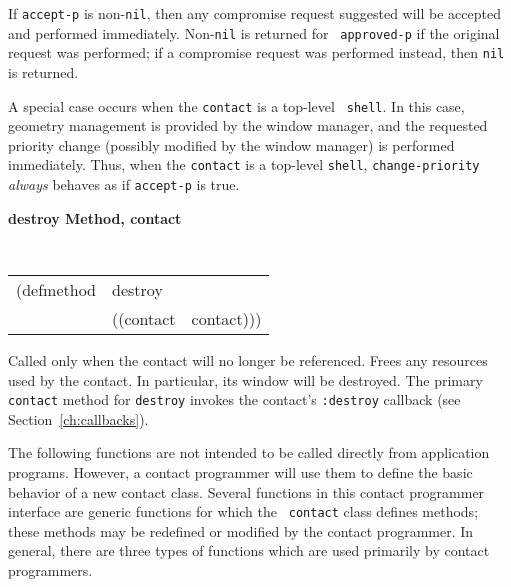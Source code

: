 \documentclass[twoside]{book}
\begin{document}
\begin{sloppy}
\begin{flushright}\parbox[t]{6.125in}{
If {\tt accept-p} is non-{\tt nil}, then any compromise request suggested will be
accepted and performed immediately. Non-{\tt nil} is returned for {\tt
approved-p} if the original request was performed; if a compromise request was
performed instead, then {\tt nil} is returned.
}\end{flushright}

\begin{flushright}\parbox[t]{6.125in}{ 
A special case occurs when the {\tt contact} is a top-level {\tt
shell}. In this case, geometry management
is provided by the window manager, and the requested
priority
change (possibly modified by the window manager) is performed immediately.
Thus, when the {\tt contact} is a top-level {\tt shell}, {\tt change-priority}
{\em always} behaves as if {\tt accept-p} is true.
}\end{flushright}


{\samepage
{\large {\bf destroy \hfill Method, contact}}
\begin{flushright}
\parbox[t]{6.125in}{
\tt
\begin{tabular}{lll}
\raggedright
(defmethod & destroy & \\
& ((contact  &contact)))
\end{tabular}
\rm
}\end{flushright}

\begin{flushright}\parbox[t]{6.125in}{
Called only when the contact will no longer be referenced. Frees any
resources used by the contact. In particular, its window will be destroyed.
The primary {\tt contact} method for {\tt destroy} invokes the contact's
{\tt :destroy} callback (see Section~\ref{ch:callbacks}).
}\end{flushright} }


The following functions are
not intended to be called directly
from application programs. However, a contact programmer will  use them to
define the basic behavior of a new contact
class. 
Several functions in this contact programmer interface are generic functions for
which the {\tt
contact} class defines methods; these methods may be redefined or modified by the
contact programmer. In general, there are three types of functions  which
are used primarily by contact programmers.


\end{sloppy}
\end{document}
